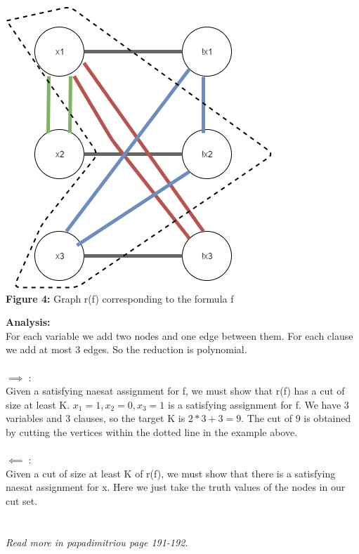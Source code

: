 \begin{center}
\includegraphics[scale=0.5]{NAESATtoMAXCUT}\\
\textbf{Figure 4:} Graph r(f) corresponding to the formula f
\end{center}
\textbf{Analysis:}\\
For each variable we add two nodes and one edge between them. For each clause we add at most 3 edges. So the reduction is polynomial.\\\\
$\implies$ :\\
Given a satisfying naesat assignment for f, we must show that r(f) has a cut of size at least K. $x_1 = 1, x_2 = 0, x_3 = 1$ is a satisfying assignment for f. We have 3 variables and 3 clauses, so the target K is $2*3+3 = 9$. The cut of 9 is obtained by cutting the vertices within the dotted line in the example above. 
\\\\
$\impliedby$ :\\
Given a cut of size at least K of r(f), we must show that there is a satisfying naesat assignment for x. Here we just take the truth values of the nodes in our cut set.
\\\\\\
\textit{Read more in papadimitriou page 191-192.}
\newpage

